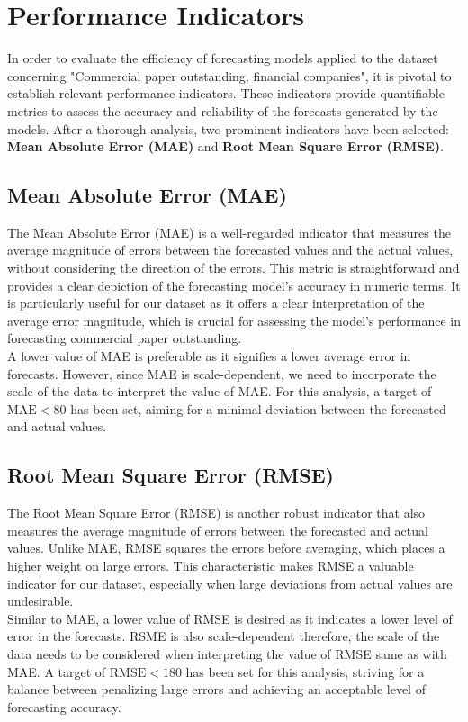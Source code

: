 \section{Performance Indicators}\label{sec:performance-indicators}

In order to evaluate the efficiency of forecasting models applied to the dataset concerning
"Commercial paper outstanding, financial companies", it is pivotal to establish relevant performance indicators.
These indicators provide quantifiable metrics to assess the accuracy and reliability of the forecasts generated by the models.
After a thorough analysis, two prominent indicators have been selected: \textbf{Mean Absolute Error (MAE)} and \textbf{Root Mean Square Error (RMSE)}.

\subsection{Mean Absolute Error (MAE)}\label{subsec:mae}

The Mean Absolute Error (MAE) is a well-regarded indicator that measures the average magnitude of errors between the
forecasted values and the actual values, without considering the direction of the errors.
This metric is straightforward and provides a clear depiction of the forecasting model's accuracy in numeric terms.
It is particularly useful for our dataset as it offers a clear interpretation of the average error magnitude,
which is crucial for assessing the model's performance in forecasting commercial paper outstanding.\\

A lower value of MAE is preferable as it signifies a lower average error in forecasts.
However, since MAE is scale-dependent, we need to incorporate the scale of the data to interpret the value of MAE.
For this analysis, a target of $\text{MAE} < 80$ has been set, aiming for a minimal deviation between the forecasted and actual values.

\subsection{Root Mean Square Error (RMSE)}\label{subsec:rmse}

The Root Mean Square Error (RMSE) is another robust indicator that also measures the average magnitude of errors between the forecasted and actual values.
Unlike MAE, RMSE squares the errors before averaging, which places a higher weight on large errors.
This characteristic makes RMSE a valuable indicator for our dataset, especially when large deviations from actual values are undesirable.\\

Similar to MAE, a lower value of RMSE is desired as it indicates a lower level of error in the forecasts.
RSME is also scale-dependent therefore, the scale of the data needs to be considered when interpreting the value of RMSE same as with MAE.
A target of $\text{RMSE} < 180$ has been set for this analysis, striving for a balance between penalizing large errors and achieving an acceptable level of forecasting accuracy.
